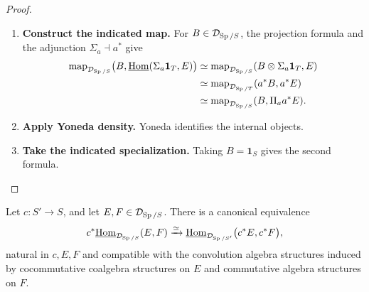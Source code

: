 \begin{proof}
\leavevmode
\begin{enumerate}[label=\textup{(\arabic*)}]
    \item \textbf{Construct the indicated map.}
    For \(B\in\mathcal D_{\operatorname{Sp}/S}\), the projection formula and the adjunction
    \(\Sigma_a\dashv a^*\) give
    \[
    \begin{aligned}
    \operatorname{map}_{\mathcal D_{\operatorname{Sp}/S}}
    \bigl(B,\underline{\operatorname{Hom}}(\Sigma_a\mathbf1_T,E)\bigr)
    &\simeq
    \operatorname{map}_{\mathcal D_{\operatorname{Sp}/S}}(B\otimes\Sigma_a\mathbf1_T,E)\\
    &\simeq
    \operatorname{map}_{\mathcal D_{\operatorname{Sp}/T}}(a^*B,a^*E)\\
    &\simeq
    \operatorname{map}_{\mathcal D_{\operatorname{Sp}/S}}(B,\Pi_aa^*E).
    \end{aligned}
    \]
    \item \textbf{Apply Yoneda density.}
    Yoneda identifies the internal objects.
    \item \textbf{Take the indicated specialization.}
    Taking \(B=\mathbf1_S\) gives the second
    formula.
\end{enumerate}
\end{proof}

\begin{proposition}
\label{prop:closed-base-change-internal-hom}
Let \(c:S'\to S\), and let \(E,F\in\mathcal D_{\operatorname{Sp}/S}\). There is a canonical
equivalence
\[
  c^*
  \underline{\operatorname{Hom}}_{\mathcal D_{\operatorname{Sp}/S}}(E,F)
  \xrightarrow{\simeq}
  \underline{\operatorname{Hom}}_{\mathcal D_{\operatorname{Sp}/S'}}
  \bigl(c^*E,c^*F\bigr),
\]
natural in \(c,E,F\) and compatible with the convolution algebra structures
induced by cocommutative coalgebra structures on \(E\) and commutative algebra
structures on \(F\).
\end{proposition}

